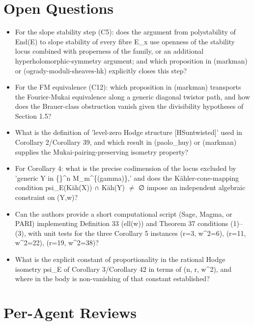 \documentclass[11pt]{article}
\begin{document}
\section*{Open Questions}
\begin{itemize}[leftmargin=*]
  \item For the slope stability step (C5): does the argument from polystability of End(E) to slope stability of every fibre E\_x use openness of the stability locus combined with properness of the family, or an additional hyperholomorphic-symmetry argument; and which proposition in (markman) or (ogrady-moduli-sheaves-hk) explicitly closes this step?
  \item For the FM equivalence (C12): which proposition in (markman) transports the Fourier-Mukai equivalence along a generic diagonal twistor path, and how does the Brauer-class obstruction vanish given the divisibility hypotheses of Section 1.5?
  \item What is the definition of 'level-zero Hodge structure [HSuntwisted]' used in Corollary 2/Corollary 39, and which result in (paolo\_huy) or (markman) supplies the Mukai-pairing-preserving isometry property?
  \item For Corollary 4: what is the precise codimension of the locus excluded by 'generic Y in \{\}\^{}n M\_m\^{}\{(gamma)\},' and does the Kähler-cone-mapping condition psi\_E(Käh(X)) ∩ Käh(Y) \ensuremath{\ne} ∅ impose an independent algebraic constraint on (Y,w)?
  \item Can the authors provide a short computational script (Sage, Magma, or PARI) implementing Definition 33 (ell(w)) and Theorem 37 conditions (1)--(3), with unit tests for the three Corollary 5 instances (r=3, w\^{}2=6), (r=11, w\^{}2=22), (r=19, w\^{}2=38)?
  \item What is the explicit constant of proportionality in the rational Hodge isometry psi\_E of Corollary 3/Corollary 42 in terms of (n, r, w\^{}2), and where in the body is non-vanishing of that constant established?
\end{itemize}

\section*{Per-Agent Reviews}
\end{document}
